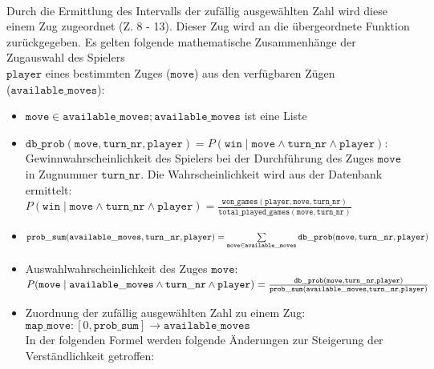 \\Durch die Ermittlung des Intervalls der zufällig ausgewählten Zahl wird diese einem Zug zugeordnet (Z. 8 - 13). 
Dieser Zug wird an die übergeordnete Funktion zurückgegeben.
\newpage
Es gelten folgende mathematische Zusammenhänge der Zugauswahl des Spielers \\$\mathtt{player}$ eines bestimmten Zuges ($\mathtt{move}$) aus den verfügbaren Zügen\\ ($\mathtt{available\_moves}$):
\begin{itemize}
\item $\mathtt{move} \in \mathtt{available\_moves}; \mathtt{available\_moves}$ ist eine Liste
\item $\mathtt{db\_prob}(\mathtt{move}, \mathtt{turn\_nr}, \mathtt{player}) = P(\mathtt{win} \mid \mathtt{move} \land \mathtt{turn\_nr} \land \mathtt{player} )$: Gewinnwahrscheinlichkeit des Spielers bei der Durchführung des Zuges $\mathtt{move}$ in Zugnummer $\mathtt{turn\_nr}$. Die Wahrscheinlichkeit wird aus der Datenbank ermittelt:
\vspace{0.25cm}\\ $P(\mathtt{win} \mid \mathtt{move} \land \mathtt{turn\_nr} \land \mathtt{player}) = \frac{\mathtt{won\_games}(\mathtt{player}, \mathtt{move}, \mathtt{turn\_nr})}{\mathtt{total\_played\_games}(\mathtt{move}, \mathtt{turn\_nr})} $
\item $\mathtt{prob\_sum}(\mathtt{available\_moves}, \mathtt{turn\_nr}, \mathtt{player}) \\= \hfill \sum\limits_{\mathtt{move} \in \mathtt{available\_moves}} \mathtt{db\_prob}(\mathtt{move},\mathtt{turn\_nr}, \mathtt{player})$
\item Auswahlwahrscheinlichkeit des Zuges $\mathtt{move}$:
\vspace{0.25cm}\\$P(\mathtt{move} \mid \mathtt{available\_moves} \land \mathtt{turn\_nr} \land \mathtt{player}) \\= \hfill \frac{ \mathtt{db\_prob}(\mathtt{move}, \mathtt{turn\_nr}, \mathtt{player})}{\mathtt{prob\_sum}(\mathtt{available\_moves}, \mathtt{turn\_nr}, \mathtt{player})} $
\item Zuordnung der zufällig ausgewählten Zahl zu einem Zug:
\\$\mathtt{map\_move}: [ 0, \mathtt{prob\_sum}] \rightarrow \mathtt{available\_moves} $
\\ In der folgenden Formel werden folgende Änderungen zur Steigerung der Verständlichkeit getroffen:
\begin{itemize}

\end{itemize}
\end{itemize}
